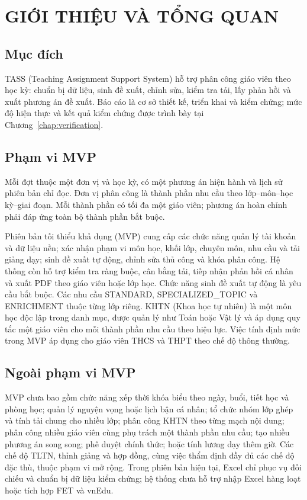 \documentclass[12pt,a4paper]{report}
\renewcommand{\listfigurename}{DANH MỤC SƠ ĐỒ VÀ HÌNH}
\begin{document}
\hypersetup{pageanchor=true}
\begingroup\small\tableofcontents\endgroup
\clearpage
\begingroup\small
\listoffigures
\addcontentsline{toc}{chapter}{\listfigurename}
\endgroup
\clearpage

\setcounter{page}{1}

\chapter{GIỚI THIỆU VÀ TỔNG QUAN}\label{chap:introduction}

\section{Mục đích}
TASS (Teaching Assignment Support System) hỗ trợ phân công giáo viên theo học kỳ: chuẩn bị dữ liệu, sinh đề xuất, chỉnh sửa, kiểm tra tải, lấy phản hồi và xuất phương án đề xuất. Báo cáo là cơ sở thiết kế, triển khai và kiểm chứng; mức độ hiện thực và kết quả kiểm chứng được trình bày tại Chương~\ref{chap:verification}.

\section{Phạm vi MVP}\label{sec:mvp}
Mỗi đợt thuộc một đơn vị và học kỳ, có một phương án hiện hành và lịch sử phiên bản chỉ đọc. Đơn vị phân công là thành phần nhu cầu theo lớp--môn--học kỳ--giai đoạn. Mỗi thành phần có tối đa một giáo viên; phương án hoàn chỉnh phải đáp ứng toàn bộ thành phần bắt buộc.

Phiên bản tối thiểu khả dụng (MVP) cung cấp các chức năng quản lý tài khoản và dữ liệu nền; xác nhận phạm vi môn học, khối lớp, chuyên môn, nhu cầu và tải giảng dạy; sinh đề xuất tự động, chỉnh sửa thủ công và khóa phân công. Hệ thống còn hỗ trợ kiểm tra ràng buộc, cân bằng tải, tiếp nhận phản hồi cá nhân và xuất PDF theo giáo viên hoặc lớp học. Chức năng sinh đề xuất tự động là yêu cầu bắt buộc. Các nhu cầu STANDARD, SPECIALIZED\_TOPIC và ENRICHMENT thuộc từng lớp riêng. KHTN (Khoa học tự nhiên) là một môn học độc lập trong danh mục, được quản lý như Toán hoặc Vật lý và áp dụng quy tắc một giáo viên cho mỗi thành phần nhu cầu theo hiệu lực. Việc tính định mức trong MVP áp dụng cho giáo viên THCS và THPT theo chế độ thông thường.

\section{Ngoài phạm vi MVP}\label{sec:out-of-scope}
MVP chưa bao gồm chức năng xếp thời khóa biểu theo ngày, buổi, tiết học và phòng học; quản lý nguyện vọng hoặc lịch bận cá nhân; tổ chức nhóm lớp ghép và tính tải chung cho nhiều lớp; phân công KHTN theo từng mạch nội dung; phân công nhiều giáo viên cùng phụ trách một thành phần nhu cầu; tạo nhiều phương án song song; phê duyệt chính thức; hoặc tính lương dạy thêm giờ. Các chế độ TLTN, thỉnh giảng và hợp đồng, cùng việc thẩm định đầy đủ các chế độ đặc thù, thuộc phạm vi mở rộng. Trong phiên bản hiện tại, Excel chỉ phục vụ đối chiếu và chuẩn bị dữ liệu kiểm chứng; hệ thống chưa hỗ trợ nhập Excel hàng loạt hoặc tích hợp FET và vnEdu.
\end{document}
